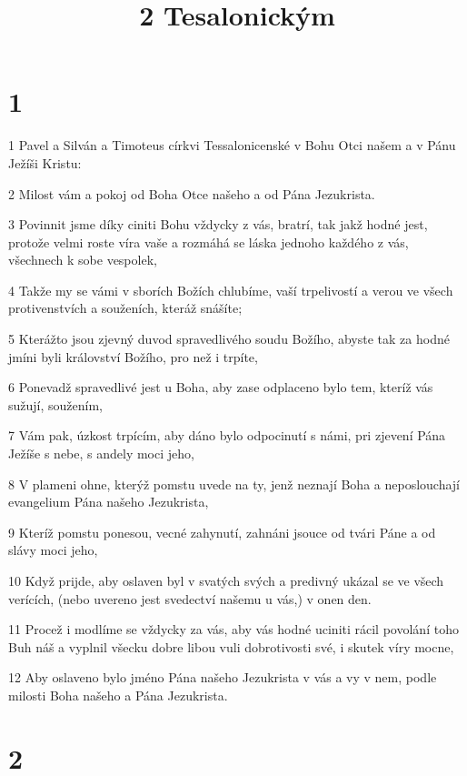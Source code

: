 

\title{2 Tesalonickým}

\chapter{1}

\par 1 Pavel a Silván a Timoteus církvi Tessalonicenské v Bohu Otci našem a v Pánu Ježíši Kristu:
\par 2 Milost vám a pokoj od Boha Otce našeho a od Pána Jezukrista.
\par 3 Povinnit jsme díky ciniti Bohu vždycky z vás, bratrí, tak jakž hodné jest, protože velmi roste víra vaše a rozmáhá se láska jednoho každého z vás, všechnech k sobe vespolek,
\par 4 Takže my se vámi v sborích Božích chlubíme, vaší trpelivostí a verou ve všech protivenstvích a souženích, kteráž snášíte;
\par 5 Kterážto jsou zjevný duvod spravedlivého soudu Božího, abyste tak za hodné jmíni byli království Božího, pro než i trpíte,
\par 6 Ponevadž spravedlivé jest u Boha, aby zase odplaceno bylo tem, kteríž vás sužují, soužením,
\par 7 Vám pak, úzkost trpícím, aby dáno bylo odpocinutí s námi, pri zjevení Pána Ježíše s nebe, s andely moci jeho,
\par 8 V plameni ohne, kterýž pomstu uvede na ty, jenž neznají Boha a neposlouchají evangelium Pána našeho Jezukrista,
\par 9 Kteríž pomstu ponesou, vecné zahynutí, zahnáni jsouce od tvári Páne a od slávy moci jeho,
\par 10 Když prijde, aby oslaven byl v svatých svých a predivný ukázal se ve všech verících, (nebo uvereno jest svedectví našemu u vás,) v onen den.
\par 11 Procež i modlíme se vždycky za vás, aby vás hodné uciniti rácil povolání toho Buh náš a vyplnil všecku dobre libou vuli dobrotivosti své, i skutek víry mocne,
\par 12 Aby oslaveno bylo jméno Pána našeho Jezukrista v vás a vy v nem, podle milosti Boha našeho a Pána Jezukrista.

\chapter{2}

